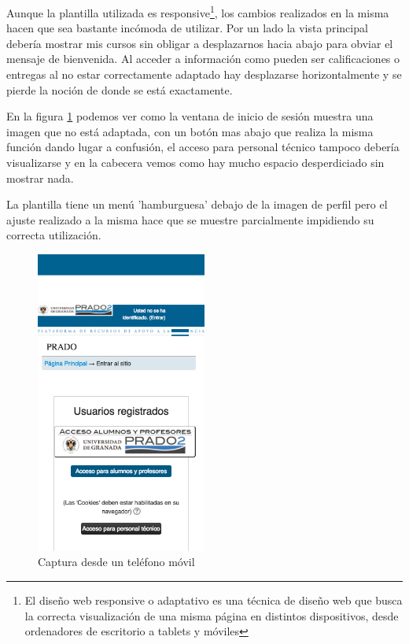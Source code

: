 \bigskip
Aunque la plantilla utilizada es responsive\footnote{El diseño web responsive o adaptativo es una técnica de diseño web que busca la correcta visualización de una misma página en distintos dispositivos, desde ordenadores de escritorio a tablets y móviles}, los cambios realizados en la misma hacen que sea bastante incómoda de utilizar. Por un lado la vista principal debería mostrar mis cursos sin obligar a desplazarnos hacia abajo para obviar el mensaje de bienvenida. Al acceder a información como pueden ser calificaciones o entregas al no estar correctamente adaptado hay desplazarse horizontalmente y se pierde la noción de donde se está exactamente.

\bigskip
En la figura \ref{fig:capturamovil2} podemos ver como la ventana de inicio de sesión muestra una imagen que no está adaptada, con un botón mas abajo que realiza la misma función dando lugar a confusión, el acceso para personal técnico tampoco debería visualizarse y en la cabecera vemos como hay mucho espacio desperdiciado sin mostrar nada.

\bigskip
La plantilla tiene un menú 'hamburguesa' debajo de la imagen de perfil pero el ajuste realizado a la misma hace que se muestre parcialmente impidiendo su correcta utilización.


\begin{figure}[H]
\centering
\includegraphics[width=0.5\textwidth]{../screenshots/capturamovil2}
\caption{Captura desde un teléfono móvil}
\label{fig:capturamovil2}
\end{figure}

